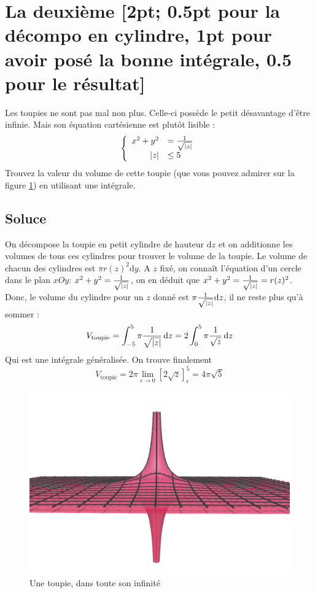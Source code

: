 \documentclass[a4paper, 11pt]{article}
\newcommand{\intg}{\mathrm{d}}
\begin{document}
\section{La deuxième [2pt; 0.5pt pour la décompo en cylindre, 1pt pour avoir posé la bonne intégrale, 0.5 pour le résultat]}
Les toupies ne sont pas mal non plus. Celle-ci possède le petit désavantage d'être infinie. Mais son équation cartésienne est plutôt lisible :
\begin{equation*}
\left\{ 
        \begin{array}{rl}
    x^2+y^2&=\frac{1}{\sqrt{\abs{z}}}\\
    \abs{z}&\leq 5
    \end{array}
    \right.
\end{equation*}
Trouvez la valeur du volume de cette toupie (que vous pouvez admirer sur la figure \ref{fig:toup}) en utilisant une intégrale.

\subsection{Soluce}
On décompose la toupie en petit cylindre de hauteur $\intg z$ et on  additionne les volumes de tous ces cylindres pour trouver le volume de la toupie. Le volume de chacun des cylindres est $\pi r(z)^2 \intg y$.\newline
A $z$ fixé, on connaît l'équation d'un cercle dans le plan $xOy$: $x^2+y^2 = \frac{1}{\sqrt{\abs{z}}}$, on en déduit que $x^2 + y^2 =  \frac{1}{\sqrt{\abs{z}}} = r(z)^2$. Donc, le volume du cylindre pour un $z$ donné est $\pi  \frac{1}{\sqrt{\abs{z}}} \intg z $, il ne reste plus qu'à sommer :
\begin{equation}
    V_{\mathrm{toupie}} = \displaystyle \int_{-5}^{5} \pi  \frac{1}{\sqrt{\abs{z}}} \, \intg z = 2\displaystyle \int_{0}^{5} \pi  \frac{1}{\sqrt{z}} \, \intg z
\end{equation}
Qui est une intégrale généralisée. On trouve finalement
\begin{equation}
    V_{\mathrm{toupie}} = 2\pi\lim \limits_{\epsilon \rightarrow 0}\left[2\sqrt{z} \right]_\epsilon^5 = 4\pi\sqrt{5}
\end{equation}




\begin{centering}

\begin{figure}
    \centering
    \includegraphics[width=0.5\columnwidth]{toupie}
    \caption{Une toupie, dans toute son infinité}
    \label{fig:toup}
\end{figure}



\end{centering}
\end{document}
